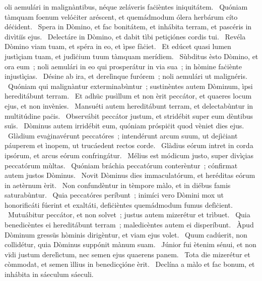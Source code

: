 \psalmChapterWithInscription{}
{ }
{%
oli aemulári in malignàntibus, néque zeláveris faċièntes iniquitátem. 
~Quóniam tàmquam foenum velóċiter aréscent, et quemádmodum ólera herbárum cíto déċident. 
~Spera in Dòmino, et fac bonitátem, et inhábita terram, et pascéris in divìtiïs ejus. 
~Delectáre in Dòmino, et dabit tìbi petiçiónes cordis tui. 
~Revéla Dòmino viam tuam, et spéra in eo, et ìpse fàċiet. 
~Et edúcet quasi lumen justìçiam tuam, et judìċium tuum tàmquam merídiem. 
~Sùbditus èsto Dòmino, et ora eum~; noli aemulári in eo qui prosperátur in via sua~; in hòmine faċiènte injustìçias. 
~Désine ab ira, et derelìnque furórem~; noli aemulári ut malignéris. 
~Quóniam qui malignàntur exterminabùntur~; sustinèntes autem Dòminum, ìpsi hereditábunt terram. 
~Et adhüc pusìllum et non èrit peccátor, et quaeres locum ejus, et non invènies. 
~Mansuéti autem hereditábunt terram, et delectabùntur in multitúdine paċis. 
~Observábit peccátor justum, et stridébit super eum dèntibus suïs. 
~Dòminus autem irridébit eum, quóniam próspiċit quod vèniet dies ejus. 
~Glàdium evaġinavérunt peccatóres~; intendérunt arcum suum, ut dejìċiant páuperem et ìnopem, ut trucáedent rectos corde. 
~Glàdius eórum intret in corda ipsórum, et arcus eórum confringátur. 
~Mélius est módicum justo, super divìçias peccatórum mùltas. 
~Quóniam bráchia peccatórum conterèntur~; cónfirmat autem justos Dòminus. 
~Novit Dòminus dies immaculatórum, et heréditas eórum in aetèrnum èrit. 
~Non confundèntur in tèmpore màlo, et in diébus famis saturabùntur. 
~Quia peccatóres períbunt~; inimíci vero Dòmini mox ut honorificáti fúerint et exaltáti, defiċièntes quemádmodum fumus defìċient. 
~Mutuábitur peccátor, et non solvet~; justus autem mizerétur et trìbuet. 
~Quia benedicèntes ei hereditábunt terram~; maledicèntes autem ei disperíbunt. 
~Àpud Dòminum gressüs hòminis dirigèntur, et viam ejus volet. 
~Quum cadúerit, non collidétur, quia Dòminus suppónit mànum suam. 
~Júnior fui ètenim sénui, et non vïdi justum derelìctum, nec semen ejus quaerens panem. 
~Tota die mizerétur et còmmodat, et semen ìllius in benedicçióne èrit. 
~Declína a màlo et fac bonum, et inhábita in sáeculum sáeculi. 
}
